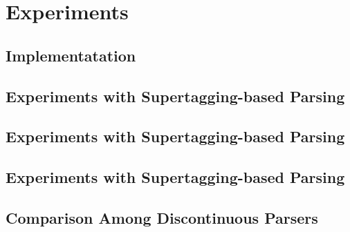 \documentclass[../document.tex]{subfiles}
\begin{document}
    \chapter{Experiments}
    \section{Implementatation}
    \section{Experiments with  Supertagging-based Parsing}
    \section{Experiments with  Supertagging-based Parsing}\label{sec:experiments:hg}
    \section{Experiments with  Supertagging-based Parsing}
    \section{Comparison Among Discontinuous Parsers}
\end{document}
